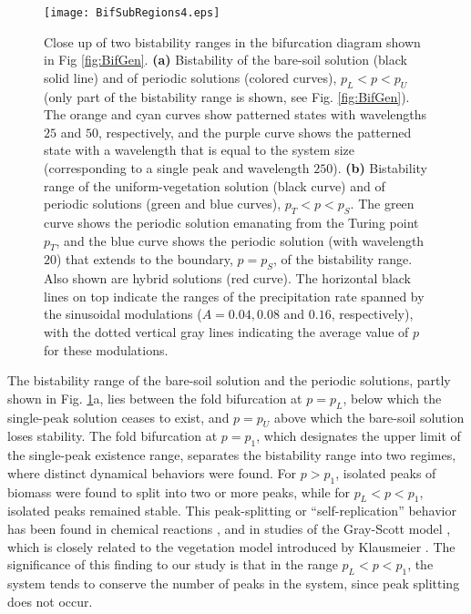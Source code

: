 \documentclass[aps,prl,preprint,superscriptaddress,floatfix]{revtex4-1}
\begin{document}
\begin{figure}
 \texttt{[image: BifSubRegions4.eps]}
   \caption{Close up of two bistability ranges in the bifurcation diagram shown in Fig \ref{fig:BifGen}.
 \textbf{(a)} Bistability of the bare-soil solution (black solid line) and of periodic solutions (colored curves), $p_L < p < p_U$ (only part of the bistability range is shown, see Fig. \ref{fig:BifGen}).
 The orange and cyan curves show patterned states with wavelengths $25$ and $50$, 
 respectively, and the purple curve shows the patterned state with a wavelength that is equal to the system size (corresponding to a single peak and wavelength $250$).
 \textbf{(b)} Bistability range of the uniform-vegetation solution (black curve) and of periodic solutions (green and blue curves), $p_T < p < p_S$. 
 The green curve shows the periodic solution emanating from the Turing point $p_T$, and the blue curve shows the periodic solution (with wavelength $20$) that extends to the boundary, $p=p_S$, of the bistability range. 
 Also shown are hybrid solutions (red curve).
 The horizontal black lines on top indicate the ranges of the precipitation rate spanned by the sinusoidal modulations ($A=0.04,0.08$ and $0.16$, respectively), with the dotted vertical gray lines indicating the average value of $p$ for these modulations.\label{fig:BifSub}}
\end{figure}

The bistability range of the bare-soil solution and the periodic solutions, partly shown in Fig. \ref{fig:BifSub}a, lies between the fold bifurcation at $p=p_L$, 
below which the single-peak solution ceases to exist, and $p=p_U$ above which the bare-soil solution loses stability.
The fold bifurcation at $p=p_1$, which designates the upper limit of the single-peak existence range, separates the bistability range into two regimes, where distinct dynamical behaviors were found.
For $p>p_1$, isolated peaks of biomass were found to split into two or more peaks, while for $p_L<p<p_1$, isolated peaks remained stable.
This peak-splitting or ``self-replication'' behavior has been found in chemical reactions \cite{lee1995lamellar}, and in studies of the Gray-Scott model \cite{doelman2000slowly}, 
which is closely related to the vegetation model introduced by Klausmeier \cite{Klausmeier1999science}.
The significance of this finding to our study is that in the range $p_L < p < p_1$, the system tends to conserve the number of peaks in the system, since peak splitting does not occur.
\end{document}

